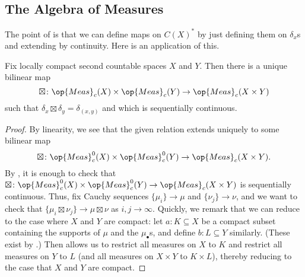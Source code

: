 \documentclass[../notes.tex]{subfiles}
\begin{document}
\subsection{The Algebra of Measures}
The point of  is that we can define maps on $C(X)^*$ by just defining them on $\delta_x$s and extending by continuity. Here is an application of this.
\begin{lemma} \label{lem:measure-algebra-operation}
	Fix locally compact second countable spaces $X$ and $Y$. Then there is a unique bilinear map
	\[\boxtimes\colon\op{Meas}_c(X)\times\op{Meas}_c(Y)\to\op{Meas}_c(X\times Y)\]
	such that $\delta_x\boxtimes\delta_y=\delta_{(x,y)}$ and which is sequentially continuous.\todo{}
\end{lemma}
\begin{proof}
	By linearity, we see that the given relation extends uniquely to some bilinear map
	\[\boxtimes\colon\op{Meas}_c^0(X)\times\op{Meas}_c^0(Y)\to\op{Meas}_c(X\times Y).\]
	By , it is enough to check that $\boxtimes\colon\op{Meas}^0_c(X)\times\op{Meas}^0_c(Y)\to\op{Meas}_c(X\times Y)$ is sequentially continuous. Thus, fix Cauchy sequences $\{\mu_i\}\to\mu$ and $\{\nu_j\}\to\nu$, and we want to check that $\{\mu_i\boxtimes\nu_j\}\to\mu\boxtimes\nu$ as $i,j\to\infty$. Quickly, we remark that we can reduce to the case where $X$ and $Y$ are compact: let $a\colon K\subseteq X$ be a compact subset containing the supports of $\mu$ and the $\mu_\bullet$s, and define $b\colon L\subseteq Y$ similarly. (These exist by .) Then  allows us to restrict all measures on $X$ to $K$ and restrict all measures on $Y$ to $L$ (and all measures on $X\times Y$ to $K\times L$), thereby reducing to the case that $X$ and $Y$ are compact.


\end{proof}
\end{document}
